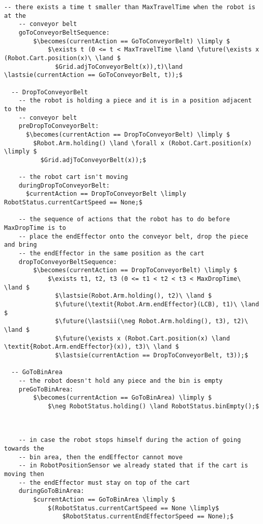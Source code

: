 \begin{lstlisting}[fontadjust, mathescape, frame=single]
    -- there exists a time t smaller than MaxTravelTime when the robot is at the 
    -- conveyor belt
    goToConveyorBeltSequence:
        $\becomes(currentAction == GoToConveyorBelt) \limply $
            $\exists t (0 <= t < MaxTravelTime \land \future(\exists x (Robot.Cart.position(x)\ \land $
              $Grid.adjToConveyorBelt(x)),t)\land \lastsie(currentAction == GoToConveyorBelt, t));$
      
  -- DropToConveyorBelt
    -- the robot is holding a piece and it is in a position adjacent to the 
    -- conveyor belt
    preDropToConveyorBelt:
      $\becomes(currentAction == DropToConveyorBelt) \limply $
        $Robot.Arm.holding() \land \forall x (Robot.Cart.position(x) \limply $
          $Grid.adjToConveyorBelt(x));$
    
    -- the robot cart isn't moving
    duringDropToConveyorBelt:
      $currentAction == DropToConveyorBelt \limply RobotStatus.currentCartSpeed == None;$

    -- the sequence of actions that the robot has to do before MaxDropTime is to 
    -- place the endEffector onto the conveyor belt, drop the piece and bring  
    -- the endEffector in the same position as the cart
    dropToConveyorBeltSequence:
        $\becomes(currentAction == DropToConveyorBelt) \limply $
            $\exists t1, t2, t3 (0 <= t1 < t2 < t3 < MaxDropTime\ \land $
              $\lastsie(Robot.Arm.holding(), t2)\ \land $
              $\future(\textit{Robot.Arm.endEffector}(LCB), t1)\ \land $
              $\future(\lastsii(\neg Robot.Arm.holding(), t3), t2)\ \land $
              $\future(\exists x (Robot.Cart.position(x) \land \textit{Robot.Arm.endEffector}(x)), t3)\ \land $
              $\lastsie(currentAction == DropToConveyorBelt, t3));$

  -- GoToBinArea
    -- the robot doesn't hold any piece and the bin is empty
    preGoToBinArea:
        $\becomes(currentAction == GoToBinArea) \limply $
            $\neg RobotStatus.holding() \land RobotStatus.binEmpty();$
    


    -- in case the robot stops himself during the action of going towards the 
    -- bin area, then the endEffector cannot move
    -- in RobotPositionSensor we already stated that if the cart is moving then 
    -- the endEffector must stay on top of the cart
    duringGoToBinArea:
        $currentAction == GoToBinArea \limply $
            $(RobotStatus.currentCartSpeed == None \limply$
                $RobotStatus.currentEndEffectorSpeed == None);$


\end{lstlisting}
